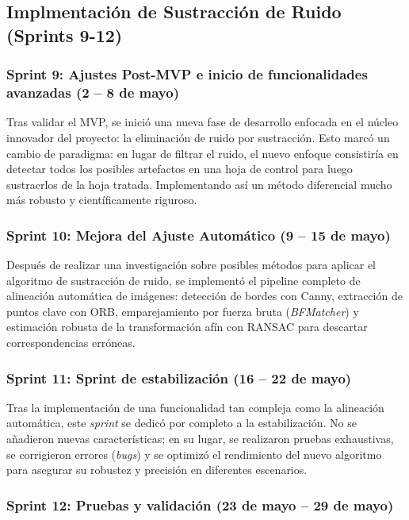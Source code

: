 \subsection{\textbf{Implmentación de Sustracción de Ruido (Sprints 9-12)}}

\subsubsection{Sprint 9: Ajustes Post-MVP e inicio de funcionalidades avanzadas (2 – 8 de mayo)}

Tras validar el MVP, se inició una nueva fase de desarrollo enfocada en el núcleo innovador del proyecto: la eliminación de ruido por sustracción. Esto marcó un cambio de paradigma: en lugar de filtrar el ruido, el nuevo enfoque consistiría en detectar todos los posibles artefactos en una hoja de control para luego sustraerlos de la hoja tratada. Implementando así un método diferencial mucho más robusto y científicamente riguroso.

\subsubsection{Sprint 10: Mejora del Ajuste Automático (9 – 15 de mayo)}

Después de realizar una investigación sobre posibles métodos para aplicar el algoritmo de sustracción de ruido, se implementó el pipeline completo de alineación automática de imágenes: detección de bordes con Canny, extracción de puntos clave con ORB, emparejamiento por fuerza bruta (\textit{BFMatcher}) y estimación robusta de la transformación afín con RANSAC para descartar correspondencias erróneas. 

\subsubsection{Sprint 11: Sprint de estabilización (16 – 22 de mayo)}

Tras la implementación de una funcionalidad tan compleja como la alineación automática, este \textit{sprint} se dedicó por completo a la estabilización. No se añadieron nuevas características; en su lugar, se realizaron pruebas exhaustivas, se corrigieron errores (\textit{bugs}) y se optimizó el rendimiento del nuevo algoritmo para asegurar su robustez y precisión en diferentes escenarios.

\subsubsection{Sprint 12:  Pruebas y validación (23 de mayo – 29 de mayo)}

